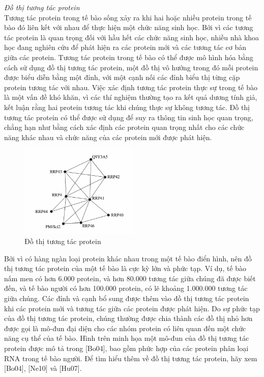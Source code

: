 \textit{Đồ thị tương tác protein} \\
Tương tác protein trong tế bào sống xảy ra khi hai hoặc nhiều protein trong tế bào đó liên kết với nhau để thực hiện một chức năng sinh học. Bởi vì các tương tác protein là quan trọng đối với hầu hết các chức năng sinh học, nhiều nhà khoa học đang nghiên cứu để phát hiện ra các protein mới và các tương tác cơ bản giữa các protein. Tương tác protein trong tế bào có thể được mô hình hóa bằng cách sử dụng đồ thị tương tác protein,
một đồ thị vô hướng trong đó mỗi protein được biểu diễn bằng một đỉnh, với một cạnh nối các đỉnh biểu thị từng cặp protein tương tác với nhau. Việc xác định tương tác protein thực sự trong tế bào là một vấn đề khó khăn, vì các thí nghiệm thường tạo ra kết quả dương tính giả, kết luận rằng hai protein tương tác khi chúng thực sự không tương tác. Đồ thị tương tác protein có thể được sử dụng để suy ra thông tin sinh học quan trọng, chẳng hạn như bằng cách xác định các protein quan trọng nhất cho các chức năng khác nhau và chức năng của các protein mới được phát hiện.
\begin{figure}[H] %
    \centering %
    \includegraphics[width=0.5\textwidth]{assets/dothi_tuongtacprotein.png} 
    \caption{Đồ thị tương tác protein} %
\end{figure}
Bởi vì có hàng ngàn loại protein khác nhau trong một tế bào điển hình, nên đồ thị tương tác protein của một tế bào là cực kỳ lớn và phức tạp. Ví dụ, tế bào nấm men có hơn 6.000 protein, và hơn 80.000 tương tác giữa chúng đã được biết đến, và tế bào người có hơn 100.000 protein, có lẽ khoảng 1.000.000 tương tác giữa chúng. Các đỉnh và cạnh bổ sung được thêm vào đồ thị tương tác protein khi các protein mới và tương tác giữa các protein được phát hiện. Do sự phức tạp của đồ thị tương tác protein, chúng thường được chia thành các đồ thị nhỏ hơn được gọi là mô-đun đại diện cho các nhóm protein có liên quan đến một chức năng cụ thể của tế bào. Hình trên minh họa một mô-đun của đồ thị tương tác protein được mô tả trong [Bo04], bao gồm phức hợp của các protein phân loại RNA trong tế bào người. Để tìm hiểu thêm về đồ thị tương tác protein, hãy xem [Bo04], [Ne10] và [Hu07].

